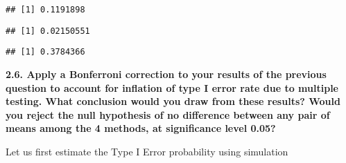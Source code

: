 \documentclass[
]{article}
\newenvironment{Shaded}{\begin{snugshade}}{\end{snugshade}}
\newcommand{\AttributeTok}[1]{\textcolor[rgb]{0.77,0.63,0.00}{#1}}
\newcommand{\FunctionTok}[1]{\textcolor[rgb]{0.00,0.00,0.00}{#1}}
\newcommand{\NormalTok}[1]{#1}
\newcommand{\OtherTok}[1]{\textcolor[rgb]{0.56,0.35,0.01}{#1}}
\newcommand{\SpecialCharTok}[1]{\textcolor[rgb]{0.00,0.00,0.00}{#1}}
\newcommand{\StringTok}[1]{\textcolor[rgb]{0.31,0.60,0.02}{#1}}
\begin{document}
\begin{verbatim}
## [1] 0.1191898
\end{verbatim}

\begin{Shaded}
\end{Shaded}

\begin{verbatim}
## [1] 0.02150551
\end{verbatim}

\begin{Shaded}
\end{Shaded}

\begin{verbatim}
## [1] 0.3784366
\end{verbatim}

\textbf{2.6. Apply a Bonferroni correction to your results of the
previous question to account for inflation of type I error rate due to
multiple testing. What conclusion would you draw from these results?
Would you reject the null hypothesis of no difference between any pair
of means among the 4 methods, at significance level 0.05?}

Let us first estimate the Type I Error probability using simulation
\end{document}
